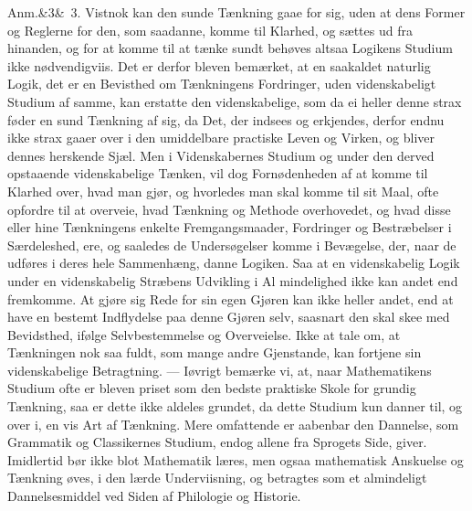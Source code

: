 \documentclass[12pt]{book}
\def\sperr#1{#1}%
\def\textit#1{#1}%
\newcommand{\sperr}[1]{\textls[180]{#1}}
\newcommand{\anm}[1]{%
  \par\vspace{0.5\baselineskip}%
  \noindent\hspace{\parindent}\sperr{Anm.}\ifx&#1&\else~\textit{#1}.\fi
  \enspace\ignorespaces
}
\newcommand{\opage}[1]{\marginnote{\footnotesize\textit{[#1]}}}
\begin{document}
\anm{3} Vistnok kan den sunde Tænkning gaae for sig, uden at dens Former og
Reglerne for den, som saadanne, komme til Klarhed, og sættes ud fra hinanden,
og for at komme til at tænke sundt behøves altsaa Logikens Studium ikke
nødvendigviis. Det er derfor bleven bemærket, at en saakaldet naturlig Logik,
det er en Bevisthed om Tænkningens Fordringer, uden videnskabeligt Studium af
samme, kan erstatte den videnskabelige, som da ei heller denne strax føder en
sund Tænkning af sig, da Det, der indsees og erkjendes, derfor endnu ikke strax
gaaer over i den umiddelbare practiske Leven og Virken, og bliver dennes
herskende Sjæl. Men i Videnskabernes Studium og under den derved opstaaende
videnskabelige Tænken, vil dog Fornødenheden af at komme til Klarhed over,
hvad man gjør, og hvorledes man skal komme til sit Maal, ofte opfordre til at
overveie, hvad Tænkning og Methode overhovedet, og hvad disse eller hine
Tænkningens enkelte Fremgangsmaader, Fordringer og Bestræbelser i
Særdeleshed, ere, og saaledes de Undersøgelser komme i Bevægelse, der, naar de
udføres i deres hele Sammenhæng, danne Logiken. Saa at en videnskabelig Logik
under en videnskabelig Stræbens Udvikling i Al%
\opage{4}mindelighed ikke kan andet end fremkomme. At gjøre sig Rede for sin egen
Gjøren kan ikke heller andet, end at have en bestemt Indflydelse paa denne
Gjøren selv, saasnart den skal skee med Bevidsthed, ifølge Selvbestemmelse og
Overveielse. Ikke at tale om, at Tænkningen nok saa fuldt, som mange andre
Gjenstande, kan fortjene sin videnskabelige Betragtning. --- Iøvrigt bemærke
vi, at, naar Mathematikens Studium ofte er bleven priset som den bedste
praktiske Skole for grundig Tænkning, saa er dette ikke aldeles grundet, da
dette Studium kun danner til, og over i, en vis Art af Tænkning. Mere
omfattende er aabenbar den Dannelse, som Grammatik og Classikernes Studium,
endog allene fra Sprogets Side, giver. Imidlertid bør ikke blot Mathematik
læres, men ogsaa mathematisk Anskuelse og Tænkning øves, i den lærde
Underviisning, og betragtes som et almindeligt Dannelsesmiddel ved Siden af
Philologie og Historie.
\end{document}
